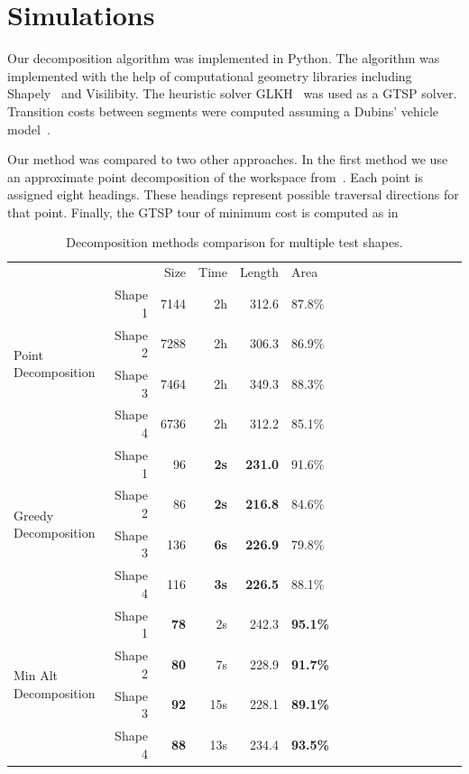 \documentclass[../main.tex]{subfiles}
\begin{document}
\section{Simulations}
\label{section:multi_simulations}

Our decomposition algorithm was implemented in Python. The algorithm was implemented with the help of computational geometry libraries including Shapely~\cite{Shapely:13} and Visilibity\cite{VisiLibity:08}. The heuristic solver GLKH~\cite{helsgaun2000effective} was used as a GTSP solver. Transition costs between segments were computed assuming a Dubins' vehicle model~\cite{dubins1957curves}.

Our method was compared to two other approaches. In the first method we use an approximate point decomposition of the workspace from~\cite{arkin2000approximation}. Each point is assigned eight headings. These headings represent possible traversal directions for that point. Finally, the GTSP tour of minimum cost is computed as in%


\begin{table}
	\centering
	\caption{Decomposition methods comparison for multiple test shapes.}
	\label{table:performance}
	\begin{tabular}{@{} l rrrr l rrrr l rrrr l@{}}
		\toprule
		&& Size & Time & Length & Area \\
		\cmidrule{3-6}
		\multirow{4}{*}{Point Decomposition} & Shape 1 & 7144 & 2h & 312.6 & 87.8\%\\
		& Shape 2 & 7288  & 2h & 306.3 & 86.9\%\\
		& Shape 3 & 7464 & 2h & 349.3 & 88.3\%\\
		& Shape 4 & 6736 & 2h & 312.2 & 85.1\%\\
		\midrule
		\multirow{4}{*}{Greedy Decomposition} & Shape 1 & 96 & \bf{2s} & \bf{231.0} & 91.6\%\\
		& Shape 2 & 86 & \bf{2s} & \bf{216.8} & 84.6\%\\
		& Shape 3 & 136 & \bf{6s} & \bf{226.9} & 79.8\%\\
		& Shape 4 & 116 & \bf{3s} & \bf{226.5} & 88.1\%\\
		\midrule
		\multirow{4}{*}{Min Alt Decomposition} & Shape 1 & \bf{78} & 2s & 242.3 & \bf{95.1\%}\\
		& Shape 2 & \bf{80} & 7s & 228.9 & \bf{91.7\%} \\
		& Shape 3 & \bf{92} & 15s & 228.1 & \bf{89.1\%} \\
		& Shape 4 & \bf{88} & 13s & 234.4 & \bf{93.5\%}\\
		\bottomrule

	\end{tabular}
\end{table}
\end{document}
